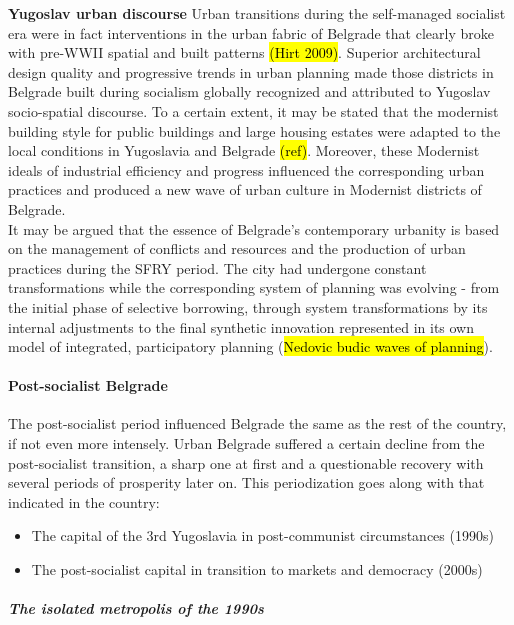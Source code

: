 \documentclass[11pt]{report}
\begin{document}
\textbf{Yugoslav urban discourse}
Urban transitions during the self-managed socialist era were in fact interventions in the urban fabric of Belgrade that clearly broke with pre-WWII spatial and built patterns \hl{(Hirt 2009)}. Superior architectural design quality and progressive trends in urban planning made those districts in Belgrade built during socialism globally recognized and attributed to Yugoslav socio-spatial discourse. To a certain extent, it may be stated that the modernist building style for  public  buildings  and  large  housing  estates were adapted to the local conditions in Yugoslavia and Belgrade \hl{(ref)}.
Moreover, these Modernist ideals of industrial efficiency and progress influenced the corresponding urban practices and produced a new wave of urban culture in Modernist districts of Belgrade.
\\
It may be argued that the essence of Belgrade's contemporary urbanity is based on the management of conflicts and resources and the production of urban practices during the SFRY period. The city had undergone constant transformations while the corresponding system of planning was evolving - from the initial phase of selective borrowing, through system transformations by its internal adjustments to the final synthetic innovation represented in its own model of integrated, participatory planning (\hl{Nedovic budic waves of planning}).

\paragraph{Post-socialist Belgrade}

The post-socialist period influenced Belgrade the same as the rest of the country, if not even more intensely. Urban Belgrade suffered a certain decline from the post-socialist transition, a sharp one at first and a questionable recovery with several periods of prosperity later on. This periodization goes along with that indicated in the country:

\begin{itemize}
\item The capital of the 3rd Yugoslavia in post-communist circumstances (1990s)
\item The post-socialist capital in transition to markets and democracy (2000s)
\end{itemize}

\subparagraph{The isolated metropolis of the 1990s}
\end{document}
